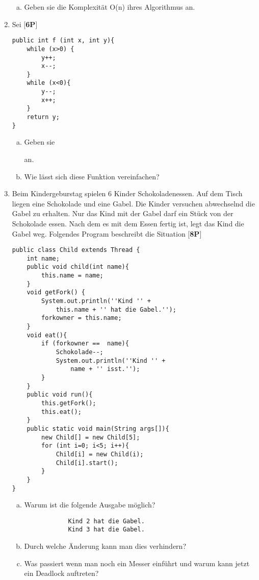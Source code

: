 \documentclass{article}
\begin{document}
\begin{enumerate}
\begin{enumerate}[a)]
			\item Geben sie die Komplexität O(n) ihres Algorithmus an.
		\end{enumerate}
	\item Sei \hfill \textbf{$[$6P$]$} 
		\begin{lstlisting}
public int f (int x, int y){
	while (x>0) {
		y++;
		x--;
	} 
	while (x<0){
		y--;
		x++;
	}
	return y;
}
		\end{lstlisting}
		\begin{enumerate}[a)]
			\item Geben sie \begin{inparaenum} \item f(4,2) \item f(2,2) \item f(-2,4) \item f(2012, 1001)\end{inparaenum}{} an.
				\item Wie lässt sich diese Funktion vereinfachen?
		\end{enumerate}
	\item Beim Kindergeburstag spielen 6 Kinder Schokoladenessen. Auf dem Tisch liegen eine Schokolade und eine Gabel. Die Kinder versuchen abwechselnd die Gabel zu erhalten. Nur das Kind mit der Gabel darf ein Stück von der Schokolade essen. Nach dem es mit dem Essen fertig ist, legt das Kind die Gabel weg. Folgendes Program beschreibt die Situation \hfill \textbf{$[$8P$]$} 
		\begin{lstlisting}
public class Child extends Thread {
	int name;
	public void child(int name){
		this.name = name;
	}
	void getFork() {
		System.out.println(''Kind '' +
			this.name + '' hat die Gabel.'');
		forkowner = this.name;
	}
	void eat(){
		if (forkowner ==  name){
			Schokolade--; 
			System.out.println(''Kind '' +
				name + '' isst.'');
		}
	}
	public void run(){
		this.getFork();
		this.eat();
	}
	public static void main(String args[]){
		new Child[] = new Child[5];
		for (int i=0; i<5; i++){
			Child[i] = new Child(i);
			Child[i].start();
		}
	}
}
\end{lstlisting}
\begin{enumerate}[a)]
	\item Warum ist die folgende Ausgabe möglich?
		\begin{lstlisting}
			Kind 2 hat die Gabel.
			Kind 3 hat die Gabel.
		\end{lstlisting}
	\item Durch welche Änderung kann man dies verhindern?
	\item Was passiert wenn man noch ein Messer einführt und warum kann jetzt ein Deadlock auftreten?

\end{enumerate}
\end{enumerate}
\end{document}
